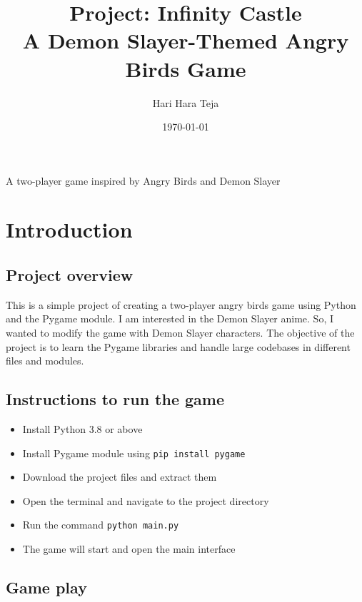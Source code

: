 \documentclass[12pt]{article}
\title{\Huge\textbf{Project: Infinity Castle}\\\vspace{0.5cm}\Large A Demon Slayer-Themed Angry Birds Game}
\author{\Large Hari Hara Teja}
\date{\today}
\begin{document}
\begin{titlepage}
\maketitle
\thispagestyle{empty}
\vfill
\begin{center}
\large{A two-player game inspired by Angry Birds and Demon Slayer}
\end{center}
\vfill
\end{titlepage}

\afterpage{\null\thispagestyle{empty}\newpage}

\tableofcontents
\thispagestyle{fancy}
\clearpage

\section{Introduction}
\subsection{Project overview}
This is a simple project of creating a two-player angry birds game using Python and the Pygame module.
I am interested in the Demon Slayer anime. So, I wanted to modify the game with Demon Slayer characters.
The objective of the project is to learn the Pygame libraries and handle large codebases in different files and modules.

\subsection{Instructions to run the game}
\begin{itemize}
    \item Install Python 3.8 or above
    \item Install Pygame module using \texttt{pip install pygame}
    \item Download the project files and extract them
    \item Open the terminal and navigate to the project directory
    \item Run the command \texttt{python main.py}
    \item The game will start and open the main interface 
\end{itemize}

\subsection{Game play}
\end{document}
